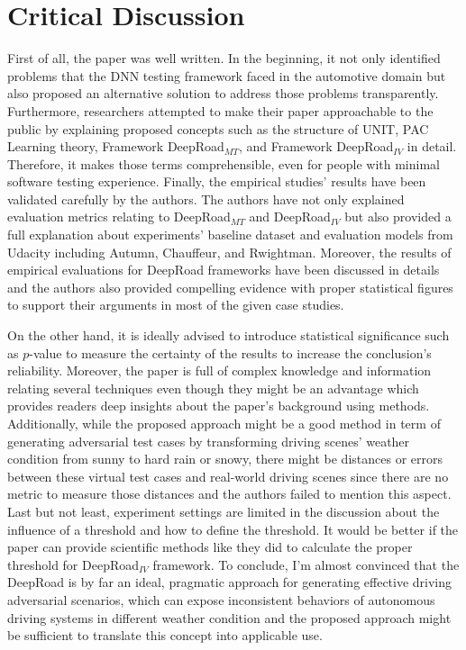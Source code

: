 \documentclass[10pt,a4paper]{report}
\begin{document}
\section{Critical Discussion}
First of all, the paper was well written. In the beginning, it not only identified problems that the DNN testing framework faced in the automotive domain but also proposed an alternative solution to address those problems transparently.
%
Furthermore, researchers attempted to make their paper approachable to the public by explaining proposed concepts such as the structure of UNIT, PAC Learning theory, Framework DeepRoad$_{MT}$, and Framework DeepRoad$_{IV}$ in detail. 
%
Therefore, it makes those terms comprehensible, even for people with minimal software testing experience.
%
Finally, the empirical studies' results have been validated carefully by the authors.
%
The authors have not only explained evaluation metrics relating to DeepRoad$_{MT}$ and DeepRoad$_{IV}$ but also provided a full explanation about experiments' baseline dataset and evaluation models from Udacity including Autumn, Chauffeur, and Rwightman.
%
Moreover, the results of empirical evaluations for DeepRoad frameworks have been discussed in details and the authors also provided compelling evidence with proper statistical figures to support their arguments in most of the given case studies.
%

On the other hand, it is ideally advised to introduce statistical significance such as $p$-value to measure the certainty of the results to increase the conclusion's reliability.
%
Moreover, the paper is full of complex knowledge and information relating several techniques even though they might be an advantage which provides readers deep insights about the paper's background using methods.
%
Additionally, while the proposed approach might be a good method in term of generating adversarial test cases by transforming driving scenes' weather condition from sunny to hard rain or snowy, there might be distances or errors between these virtual test cases and real-world driving scenes since there are no metric to measure those distances and the authors failed to mention this aspect.
%
Last but not least, experiment settings are limited in the discussion about the influence of a threshold and how to define the threshold.
%
It would be better if the paper can provide scientific methods like they did to calculate the proper threshold for DeepRoad$_{IV}$ framework.
%
To conclude, I’m almost convinced that the DeepRoad is by far an ideal, pragmatic approach for generating effective driving adversarial scenarios, which can expose inconsistent behaviors of autonomous driving systems in different weather condition and the proposed approach might be sufficient to translate this concept into applicable use.
\end{document}
